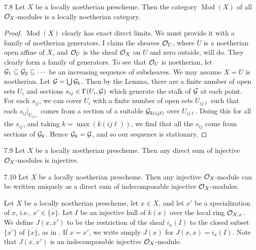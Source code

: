 \begin{booktheorem}{7.8}\label{thm:2.7.8}
Let $X$ be a locally noetherian prescheme. Then the category $\operatorname{Mod}(X)$ of all $\mathcal{O}_X$-modules is a locally noetherian category.
\end{booktheorem}

\begin{proof}
$\operatorname{Mod}(X)$ clearly has exact direct limits. We must provide it with a family of noetherian generators. I claim the sheaves $\mathcal{O}_U$, where $U$ is a noetherian open affine of $X$, and $\mathcal{O}_U$ is the sheaf $\mathcal{O}_X$ on $U$ and zero outside, will do. They clearly form a family of generators. To see that $\mathcal{O}_U$ is noetherian, let $\mathcal{G}_1\subseteq\mathcal{G}_2\subseteq\cdots$ be an increasing sequence of subsheaves. We may assume $X=U$ is noetherian. Let $\mathcal{G}=\bigcup\mathcal{G}_k$. Then by the Lemma, there are a finite number of open sets $U_i$ and sections $s_{ij}\in\Gamma(U_i,\mathcal{G})$ which generate the stalk of $\mathcal{G}$ at each point. For each $s_{ij}$, we can cover $U_i$ with a finite number of open sets $U_{ij\ell}$ such that each $s_{ij}|_{U_{ij\ell}}$ comes from a section of a suitable $\mathcal{G}_{k(ij\ell)}$ over $U_{ij\ell}$. Doing this for all the $s_{ij}$, and taking $k=\max(k(ij\ell))$, we find that all the $s_{ij}$ come from sections of $\mathcal{G}_k$. Hence $\mathcal{G}_k=\mathcal{G}$, and so our sequence is stationary.
\end{proof}

\begin{bookcorollary}{7.9}\label{cor:2.7.9}
Let $X$ be a locally noetherian prescheme. Then any direct sum of injective $\mathcal{O}_X$-modules is injective.
\end{bookcorollary}

\begin{bookcorollary}{7.10}\label{cor:2.7.10}
Let $X$ be a locally noetherian prescheme. Then any injective $\mathcal{O}_X$-module can be written uniquely as a direct sum of indecomposable injective $\mathcal{O}_X$-modules.
\end{bookcorollary}

\begin{definition*}
Let $X$ be a locally noetherian prescheme, let $x\in X$, and let $x'$ be a specialization of $x$, i.e., $x'\in\overline{\{x\}}$. Let $I$ be an injective hull of $k(x)$ over the local ring $\mathcal{O}_{X,x}$. We define $J(x,x')$ to be the restriction of the sheaf $i_x(I)$ to the closed subset $\overline{\{x'\}}$ of $\overline{\{x\}}$, as in \cite[\nopp II, Thm.~2.9.1]{G}. If $x=x'$, we write simply $J(x)$ for $J(x,x)=i_x(I)$. Note that $J(x,x')$ is an indecomposable injective $\mathcal{O}_X$-module.
\end{definition*}

